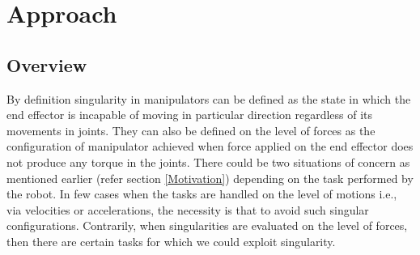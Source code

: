 
\chapter{Approach}
\label{Approach}

\section{Overview}
By definition singularity in manipulators can be defined as the state in which the end effector is incapable of moving in particular direction regardless of its movements in joints. They can also be defined on the level of forces as the configuration of manipulator achieved when force applied on the end effector does not produce any torque in the joints. There could be two situations of concern as mentioned earlier (refer section \ref{Motivation}) depending on the task performed by the robot. In few cases when the tasks are handled on the level of motions i.e., via velocities or accelerations, the necessity is that to avoid such singular configurations. Contrarily, when singularities are evaluated on the level of forces, then there are certain tasks for which we could exploit singularity. 

